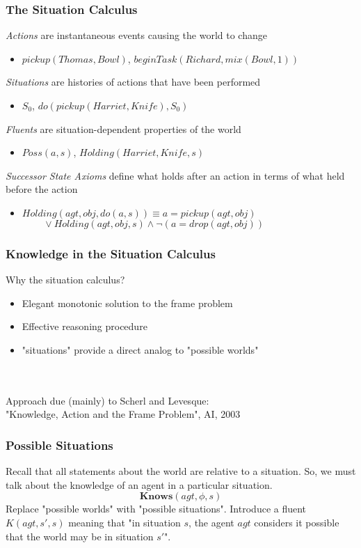 \documentclass{beamer}
\begin{document}
\begin{frame}
\frametitle{The Situation Calculus}
\emph{Actions} are instantaneous events causing the world to change
\begin{itemize}
  \item $pickup(Thomas,Bowl)$, $beginTask(Richard,mix(Bowl,1))$
\end{itemize}
\emph{Situations} are histories of actions that have been performed
\begin{itemize}
  \item $S_0$, $do(pickup(Harriet,Knife),S_0)$
\end{itemize}
\emph{Fluents} are situation-dependent properties of the world
\begin{itemize}
  \item $Poss(a,s)$, $Holding(Harriet,Knife,s)$
\end{itemize}
\emph{Successor State Axioms} define what holds after an action in terms of what held before the action
\begin{itemize}
  \item $Holding(agt,obj,do(a,s)) \equiv a = pickup(agt,obj)$ \\
        $\,\,\,\,\,\,\,\,\,\,\,\,\,\vee Holding(agt,obj,s) \wedge \neg\left(a = drop(agt,obj)\right)$
\end{itemize}
\end{frame}

\begin{frame}
\frametitle{Knowledge in the Situation Calculus}

Why the situation calculus?
\begin{itemize}
\item Elegant monotonic solution to the frame problem
\item Effective reasoning procedure
\item "situations" provide a direct analog to "possible worlds"
\end{itemize}
\ \\
\ \\
Approach due (mainly) to Scherl and Levesque:\\
"Knowledge, Action and the Frame Problem", AI, 2003

\end{frame}

\begin{frame}
\frametitle{Possible Situations}
Recall that all statements about the world are relative to a situation.
So, we must talk about the knowledge of an agent in a particular situation.
\begin{equation*}
\mathbf{Knows}(agt,\phi,s)
\end{equation*}
\pause
Replace "possible worlds" with "possible situations".  Introduce a fluent
$K(agt,s',s)$ meaning that "in situation $s$, the agent $agt$ considers it
possible that the world may be in situation $s'$".
\end{frame}
\end{document}
